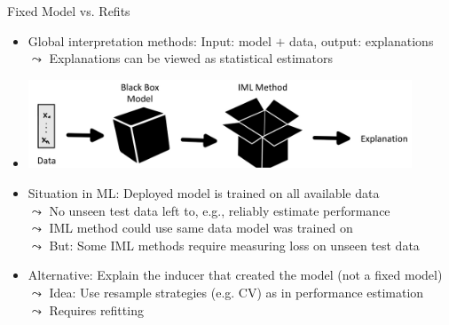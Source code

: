 \documentclass[10pt,compress,t,notes=noshow, xcolor=table]{beamer}
\begin{document}
\begin{frame}{Fixed Model vs. Refits}
\begin{itemize}
     \item Global interpretation methods: Input: model $+$ data, output: explanations\\
    $\leadsto$ Explanations can be viewed as statistical estimators
    \item[] \centerline{\includegraphics[width=0.9\textwidth]{figure/fixed_model_vs_refits.jpg}}
    \item Situation in ML: Deployed model is trained on all available data\\
    $\leadsto$ No unseen test data left to, e.g., reliably estimate performance\\
    $\leadsto$ IML method could use same data model was trained on \\
    $\leadsto$ But: Some IML methods require measuring loss on unseen test data
    \item Alternative: Explain the inducer that created the model (not a fixed model)\\
    $\leadsto$ Idea: Use resample strategies (e.g. CV) as in performance estimation\\
    $\leadsto$ Requires refitting
\end{itemize}
\end{frame}
\end{document}
